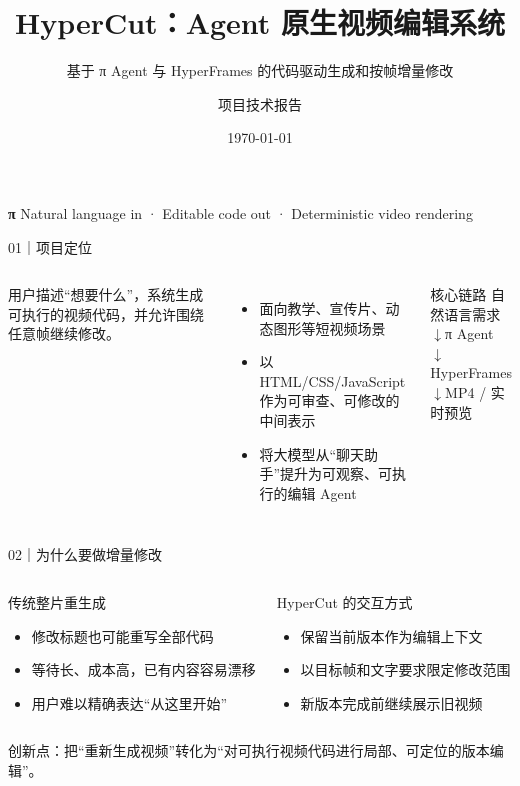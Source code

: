 \documentclass[aspectratio=169,UTF8,11pt]{ctexbeamer}
\title{HyperCut：Agent 原生视频编辑系统}
\subtitle{基于 π Agent 与 HyperFrames 的代码驱动生成和按帧增量修改}
\author{项目技术报告}
\date{\today}
\begin{document}
{
\begin{frame}[plain]
  \vspace{1.1cm}
  {\color{hclime}\Large\bfseries π}
  \vfill
  \titlepage
  \vfill
  {\color{gray}\small Natural language in · Editable code out · Deterministic video rendering}
\end{frame}}

\begin{frame}{01｜项目定位}
  \begin{columns}[T,onlytextwidth]
      \Large 用户描述“想要什么”，系统生成可执行的视频代码，并允许围绕任意帧继续修改。
      \vspace{0.55cm}
      \begin{itemize}
        \item 面向教学、宣传片、动态图形等短视频场景
        \item 以 HTML/CSS/JavaScript 作为可审查、可修改的中间表示
        \item 将大模型从“聊天助手”提升为可观察、可执行的编辑 Agent
      \end{itemize}
      \begin{block}{核心链路}
        自然语言需求
        \\[1mm]$\downarrow$\quad π Agent
        \\[1mm]$\downarrow$\quad HyperFrames
        \\[1mm]$\downarrow$\quad MP4 / 实时预览
      \end{block}
  \end{columns}
\end{frame}

\begin{frame}{02｜为什么要做增量修改}
  \begin{columns}[T,onlytextwidth]
      \begin{block}{传统整片重生成}
        \begin{itemize}
          \item 修改标题也可能重写全部代码
          \item 等待长、成本高，已有内容容易漂移
          \item 用户难以精确表达“从这里开始”
        \end{itemize}
      \end{block}
      \begin{block}{HyperCut 的交互方式}
        \begin{itemize}
          \item 保留当前版本作为编辑上下文
          \item 以目标帧和文字要求限定修改范围
          \item 新版本完成前继续展示旧视频
        \end{itemize}
      \end{block}
  \end{columns}
  \vspace{0.45cm}
  \centering
  \alert{创新点：把“重新生成视频”转化为“对可执行视频代码进行局部、可定位的版本编辑”。}
\end{frame}
\end{document}
